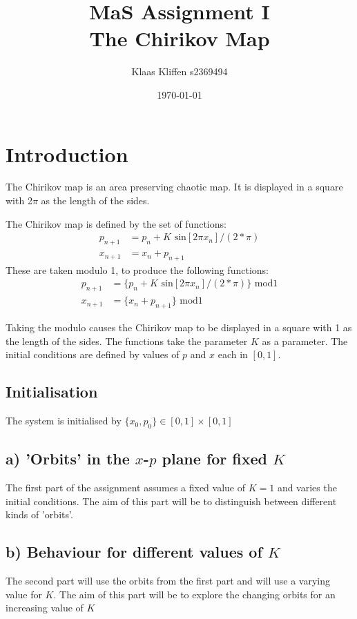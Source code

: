 \documentclass[a4paper,11pt]{article}
\title{MaS Assignment I\\
\large The Chirikov Map}
\author{Klaas Kliffen s2369494}
\date{\today}
\begin{document}
\maketitle

\section{Introduction}

The Chirikov map is an area preserving chaotic map. It is displayed in a square with 2$\pi$ as the length of the sides.

The Chirikov map is defined by the set of functions:
\begin{align} 
p_{n+1} &= p_n + K \text{ sin}[2\pi x_n] / (2*\pi)\\
x_{n+1} &= x_n + p_{n+1}
\end{align}
These are taken modulo 1, to produce the following functions:
\begin{align} 
p_{n+1} &= \{p_n + K \text{ sin}[2\pi x_n] / (2*\pi)\} \text{ mod} 1\\ 
x_{n+1} &= \{x_n + p_{n+1}\} \text{ mod} 1
\end{align}

Taking the modulo causes the Chirikov map to be displayed in a square with 1 as the length of the sides.
The functions take the parameter $K$ as a parameter. The initial conditions are defined by values of $p$ and $x$ each in $[0,1]$.

\subsection*{Initialisation}
The system is initialised by $\{x_0,p_0\} \in [0,1] \times [0,1]$

\subsection*{a) 'Orbits' in the $x$-$p$ plane for fixed $K$}
The first part of the assignment assumes a fixed value of $K = 1$ and varies the initial conditions. The aim of this part will be to distinguish between different kinds of 'orbits'.

\subsection*{b) Behaviour for different values of $K$}
The second part will use the orbits from the first part and will use a varying value for $K$.
The aim of this part will be to explore the changing orbits for an increasing value of $K$
\end{document}
